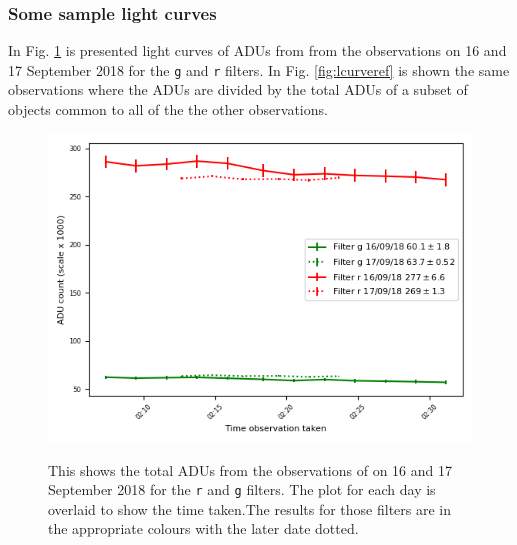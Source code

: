 \subsubsection{Some sample light curves}
\protect\label{section:samplelightcurves}

In Fig. \ref{fig:lcurvesing} is presented light curves of ADUs from {\prox}
from the observations on 16 and 17 September 2018 for the \texttt{g} and
\texttt{r} filters. In Fig. \ref{fig:lcurveref} is shown the same observations
where the ADUs are divided by the total ADUs of a subset of objects common to
all of the the other observations.

\begin{figure}[!htbp]
\begin{center}
\includegraphics[scale=1]{images/demo_lcurve.png}
\end{center}   
\caption{This shows the total ADUs from the observations of {\prox} on 16 and
17 September 2018 for the \texttt{r} and \texttt{g} filters. The plot for each
day is overlaid to show the time taken.The results for those filters are in the appropriate colours with the later date dotted.}
\protect\label{fig:lcurvesing}
\end{figure}

